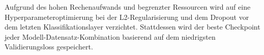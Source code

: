 Aufgrund des hohen Rechenaufwands und begrenzter Ressourcen wird auf eine Hyperparameteroptimierung bei der L2-Regularisierung und dem Dropout vor dem letzten Klassifikationslayer verzichtet. Stattdessen wird der beste Checkpoint jeder Modell-Datensatz-Kombination basierend auf dem niedrigsten Validierungsloss gespeichert.